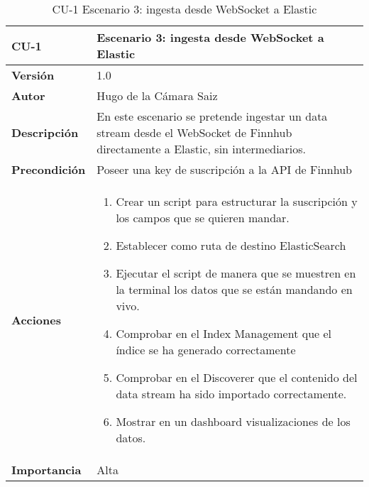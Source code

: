 \begin{table}[p]
	\centering
	\begin{tabularx}{\linewidth}{ p{} p{} }
		\toprule
		\textbf{CU-1}    & \textbf{Escenario 3: ingesta desde WebSocket a Elastic}\\
		\toprule
		\textbf{Versión}              & 1.0    \\
		\textbf{Autor}                & Hugo de la Cámara Saiz \\
		\textbf{Descripción}          & En este escenario se pretende ingestar un data stream desde el WebSocket de Finnhub directamente a Elastic, sin intermediarios. \\
		\textbf{Precondición}         & Poseer una key de suscripción a la API de Finnhub \\
		\textbf{Acciones}             &
		\begin{enumerate}
			\def\labelenumi{\arabic{enumi}.}
			\tightlist
			\item Crear un script para estructurar la suscripción y los campos que se quieren mandar.
                \item Establecer como ruta de destino ElasticSearch
                \item Ejecutar el script de manera que se muestren en la terminal los datos que se están mandando en vivo.
                \item Comprobar en el Index Management que el índice se ha generado correctamente
			\item Comprobar en el Discoverer que el contenido del data stream ha sido importado correctamente.
                \item Mostrar en un dashboard visualizaciones de los datos.
		\end{enumerate}\\
		\textbf{Importancia}          & Alta \\
		\bottomrule
	\end{tabularx}
	\caption{CU-1 Escenario 3: ingesta desde WebSocket a Elastic}
\end{table}

